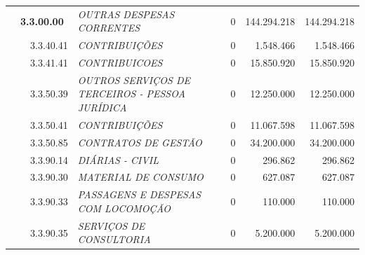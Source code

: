 \documentclass{article}
\begin{document}
\begin{longtable}[c]{m{0.1cm}m{0.1cm}m{0.8cm}|m{8cm}|m{2cm}|m{2cm}|m{2cm}}
\multicolumn{1}{l}{} & \multicolumn{2}{l|}{\textbf{3.3.00.00}} & \multicolumn{1}{L{8cm}|}{\textit{OUTRAS DESPESAS CORRENTES}} & \multicolumn{1}{r|}{0} & \multicolumn{1}{r|}{144.294.218} &  \multicolumn{1}{r}{144.294.218}\\
\multicolumn{1}{l}{} & \multicolumn{1}{l}{} & \multicolumn{1}{l|}{3.3.40.41} & \multicolumn{1}{L{8cm}|}{\textit{CONTRIBUIÇÕES}} & \multicolumn{1}{r|}{0} & \multicolumn{1}{r|}{1.548.466} &  \multicolumn{1}{r}{1.548.466}\\
\multicolumn{1}{l}{} & \multicolumn{1}{l}{} & \multicolumn{1}{l|}{3.3.41.41} & \multicolumn{1}{L{8cm}|}{\textit{CONTRIBUICOES}} & \multicolumn{1}{r|}{0} & \multicolumn{1}{r|}{15.850.920} &  \multicolumn{1}{r}{15.850.920}\\
\multicolumn{1}{l}{} & \multicolumn{1}{l}{} & \multicolumn{1}{l|}{3.3.50.39} & \multicolumn{1}{L{8cm}|}{\textit{OUTROS SERVIÇOS DE TERCEIROS - PESSOA JURÍDICA}} & \multicolumn{1}{r|}{0} & \multicolumn{1}{r|}{12.250.000} &  \multicolumn{1}{r}{12.250.000}\\
\multicolumn{1}{l}{} & \multicolumn{1}{l}{} & \multicolumn{1}{l|}{3.3.50.41} & \multicolumn{1}{L{8cm}|}{\textit{CONTRIBUIÇÕES}} & \multicolumn{1}{r|}{0} & \multicolumn{1}{r|}{11.067.598} &  \multicolumn{1}{r}{11.067.598}\\
\multicolumn{1}{l}{} & \multicolumn{1}{l}{} & \multicolumn{1}{l|}{3.3.50.85} & \multicolumn{1}{L{8cm}|}{\textit{CONTRATOS DE GESTÃO}} & \multicolumn{1}{r|}{0} & \multicolumn{1}{r|}{34.200.000} &  \multicolumn{1}{r}{34.200.000}\\
\multicolumn{1}{l}{} & \multicolumn{1}{l}{} & \multicolumn{1}{l|}{3.3.90.14} & \multicolumn{1}{L{8cm}|}{\textit{DIÁRIAS - CIVIL}} & \multicolumn{1}{r|}{0} & \multicolumn{1}{r|}{296.862} &  \multicolumn{1}{r}{296.862}\\
\multicolumn{1}{l}{} & \multicolumn{1}{l}{} & \multicolumn{1}{l|}{3.3.90.30} & \multicolumn{1}{L{8cm}|}{\textit{MATERIAL DE CONSUMO}} & \multicolumn{1}{r|}{0} & \multicolumn{1}{r|}{627.087} &  \multicolumn{1}{r}{627.087}\\
\multicolumn{1}{l}{} & \multicolumn{1}{l}{} & \multicolumn{1}{l|}{3.3.90.33} & \multicolumn{1}{L{8cm}|}{\textit{PASSAGENS E DESPESAS COM LOCOMOÇÃO}} & \multicolumn{1}{r|}{0} & \multicolumn{1}{r|}{110.000} &  \multicolumn{1}{r}{110.000}\\
\multicolumn{1}{l}{} & \multicolumn{1}{l}{} & \multicolumn{1}{l|}{3.3.90.35} & \multicolumn{1}{L{8cm}|}{\textit{SERVIÇOS DE CONSULTORIA}} & \multicolumn{1}{r|}{0} & \multicolumn{1}{r|}{5.200.000} &  \multicolumn{1}{r}{5.200.000}\\

\end{longtable}
\end{document}
